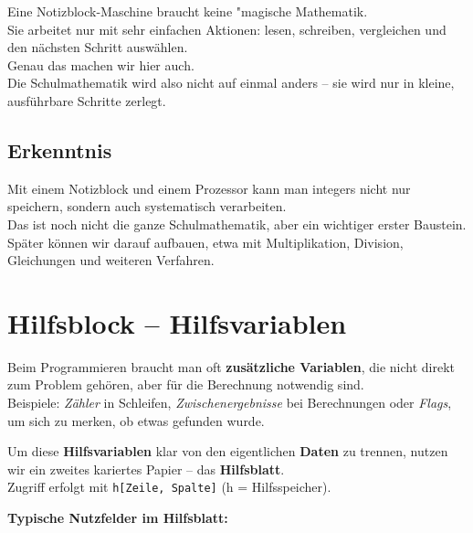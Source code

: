 \documentclass{article}
\begin{document}
        
  Eine Notizblock-Maschine braucht keine "magische Mathematik.\\
            Sie arbeitet nur mit sehr einfachen Aktionen: lesen, schreiben, vergleichen und den nächsten Schritt auswählen.\\
            Genau das machen wir hier auch.\\
            Die Schulmathematik wird also nicht auf einmal anders – sie wird nur in kleine, ausführbare Schritte zerlegt.


          \subsection{Erkenntnis}

        
  Mit einem Notizblock und einem Prozessor kann man integers nicht nur speichern, sondern auch systematisch verarbeiten.\\
            Das ist noch nicht die ganze Schulmathematik, aber ein wichtiger erster Baustein.\\
            Später können wir darauf aufbauen, etwa mit Multiplikation, Division, Gleichungen und weiteren Verfahren.
    

    
      
        \section{Hilfsblock – Hilfsvariablen}
        
Beim Programmieren braucht man oft \textbf{zusätzliche Variablen}, die nicht direkt zum Problem gehören, aber für die Berechnung notwendig sind.\\
          Beispiele: \emph{Zähler} in Schleifen, \emph{Zwischenergebnisse} bei Berechnungen oder \emph{Flags}, um sich zu merken, ob etwas gefunden wurde.


        
Um diese \textbf{Hilfsvariablen} klar von den eigentlichen \textbf{Daten} zu trennen, nutzen wir ein zweites kariertes Papier – das \textbf{Hilfsblatt}.\\
          Zugriff erfolgt mit \texttt{h[Zeile, Spalte]} (h = Hilfsspeicher).


        
\textbf{Typische Nutzfelder im Hilfsblatt:}
\end{document}
